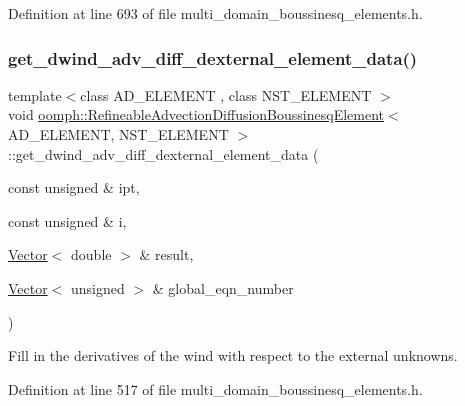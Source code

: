Definition at line 693 of file multi\+\_\+domain\+\_\+boussinesq\+\_\+elements.\+h.

\mbox{\label{classoomph_1_1RefineableAdvectionDiffusionBoussinesqElement_a560911c835c054a25b5e5d8390cc422c}} 
\subsubsection{\texorpdfstring{get\+\_\+dwind\+\_\+adv\+\_\+diff\+\_\+dexternal\+\_\+element\+\_\+data()}{get\_dwind\_adv\_diff\_dexternal\_element\_data()}}
{\footnotesize\ttfamily template$<$class A\+D\+\_\+\+E\+L\+E\+M\+E\+NT , class N\+S\+T\+\_\+\+E\+L\+E\+M\+E\+NT $>$ \\
void \hyperlink{classoomph_1_1RefineableAdvectionDiffusionBoussinesqElement}{oomph\+::\+Refineable\+Advection\+Diffusion\+Boussinesq\+Element}$<$ A\+D\+\_\+\+E\+L\+E\+M\+E\+NT, N\+S\+T\+\_\+\+E\+L\+E\+M\+E\+NT $>$\+::get\+\_\+dwind\+\_\+adv\+\_\+diff\+\_\+dexternal\+\_\+element\+\_\+data (\begin{DoxyParamCaption}\item[{const unsigned \&}]{ipt,  }\item[{const unsigned \&}]{i,  }\item[{\hyperlink{classoomph_1_1Vector}{Vector}$<$ double $>$ \&}]{result,  }\item[{\hyperlink{classoomph_1_1Vector}{Vector}$<$ unsigned $>$ \&}]{global\+\_\+eqn\+\_\+number }\end{DoxyParamCaption})\hspace{0.3cm}{\ttfamily [inline]}}



Fill in the derivatives of the wind with respect to the external unknowns. 



Definition at line 517 of file multi\+\_\+domain\+\_\+boussinesq\+\_\+elements.\+h.

